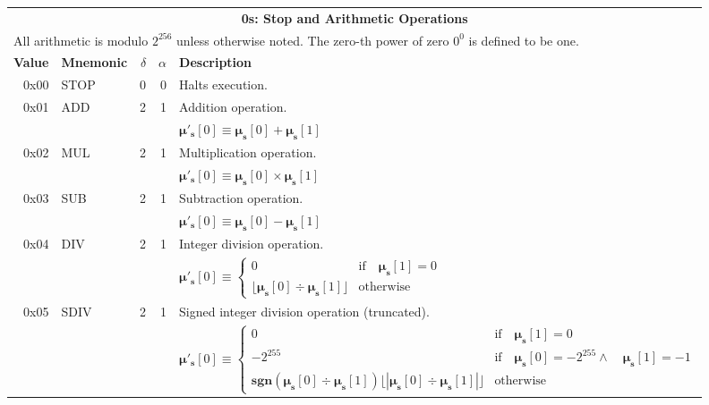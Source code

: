 \documentclass[9pt,oneside]{amsart}
\begin{document}
\begin{tabular*}{\columnwidth}[h]{rlrrl}
\toprule
\multicolumn{5}{c}{\textbf{0s: Stop and Arithmetic Operations}} \\
\multicolumn{5}{l}{All arithmetic is modulo $2^{256}$ unless otherwise noted. The zero-th power of zero $0^0$ is defined to be one.} \vspace{5pt} \\
\textbf{Value} & \textbf{Mnemonic} & $\delta$ & $\alpha$ & \textbf{Description} \vspace{5pt} \\
0x00 & {\small STOP} & 0 & 0 & Halts execution. \\
\midrule
0x01 & {\small ADD} & 2 & 1 & Addition operation. \\
&&&& $\boldsymbol{\mu}'_\mathbf{s}[0] \equiv \boldsymbol{\mu}_\mathbf{s}[0] + \boldsymbol{\mu}_\mathbf{s}[1]$ \\
\midrule
0x02 & {\small MUL} & 2 & 1 & Multiplication operation. \\
&&&& $\boldsymbol{\mu}'_\mathbf{s}[0] \equiv \boldsymbol{\mu}_\mathbf{s}[0] \times \boldsymbol{\mu}_\mathbf{s}[1]$ \\
\midrule
0x03 & {\small SUB} & 2 & 1 & Subtraction operation. \\
&&&& $\boldsymbol{\mu}'_\mathbf{s}[0] \equiv \boldsymbol{\mu}_\mathbf{s}[0] - \boldsymbol{\mu}_\mathbf{s}[1]$ \\
\midrule
0x04 & {\small DIV} & 2 & 1 & Integer division operation. \\
&&&& $\boldsymbol{\mu}'_\mathbf{s}[0] \equiv \begin{cases}0 & \text{if} \quad \boldsymbol{\mu}_\mathbf{s}[1] = 0\\ \lfloor\boldsymbol{\mu}_\mathbf{s}[0] \div \boldsymbol{\mu}_\mathbf{s}[1]\rfloor & \text{otherwise}\end{cases}$  \\
\midrule
0x05 & {\small SDIV} & 2 & 1 & Signed integer division operation (truncated). \\
&&&& $\boldsymbol{\mu}'_\mathbf{s}[0] \equiv \begin{cases}0 & \text{if} \quad \boldsymbol{\mu}_\mathbf{s}[1] = 0\\ -2^{255} & \text{if} \quad \boldsymbol{\mu}_\mathbf{s}[0] = -2^{255} \wedge \quad \boldsymbol{\mu}_\mathbf{s}[1] = -1\\ \mathbf{sgn} (\boldsymbol{\mu}_\mathbf{s}[0] \div \boldsymbol{\mu}_\mathbf{s}[1]) \lfloor |\boldsymbol{\mu}_\mathbf{s}[0] \div \boldsymbol{\mu}_\mathbf{s}[1]| \rfloor & \text{otherwise}\end{cases}$  \\

\end{tabular*}
\end{document}

